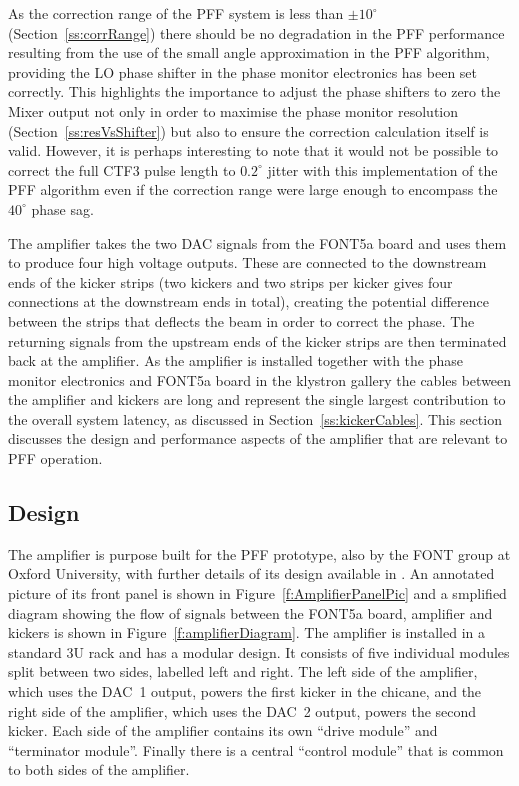 As the correction range of the PFF system is less than \(\pm10^\circ\) (Section~\ref{ss:corrRange}) there should be no degradation in the PFF performance resulting from the use of the small angle approximation in the PFF algorithm, providing the LO phase shifter in the phase monitor electronics has been set correctly. This highlights the importance to adjust the phase shifters to zero the Mixer output not only in order to maximise the phase monitor resolution (Section~\ref{ss:resVsShifter}) but also to ensure the correction calculation itself is valid. However, it is perhaps interesting to note that it would not be possible to correct the full CTF3 pulse length to \(0.2^\circ\) jitter with this implementation of the PFF algorithm even if the correction range were large enough to encompass the \(40^\circ\) phase sag.


The amplifier takes the two DAC signals from the FONT5a board and
uses them to produce four high voltage outputs. These are connected to the downstream ends of the kicker strips (two kickers and two strips per kicker gives four connections at the downstream ends in total), creating the potential difference between the strips that deflects the beam in order to correct the phase. The returning signals from the upstream ends of the kicker strips are then terminated back at the amplifier. As the amplifier is installed together with the phase monitor electronics and FONT5a board in the klystron gallery the cables between the amplifier and kickers are long and represent the single largest contribution to the overall system latency, as discussed in Section~\ref{ss:kickerCables}. This section discusses the design and performance aspects of the amplifier that are relevant to PFF operation.

\subsection{Design}
\label{ss:ampDesign}

The amplifier is purpose built for the PFF prototype, also by the FONT group at Oxford University, with further details of its design available in \cite{colinCLIC16}. An annotated picture of its front panel is shown in Figure~\ref{f:AmplifierPanelPic} and a smplified diagram showing the flow of signals between the FONT5a board, amplifier and kickers is shown in Figure~\ref{f:amplifierDiagram}.
The amplifier is installed in a standard 3U rack and has a modular design. It consists of five individual modules split between two sides, labelled left and right. The left side of the amplifier, which uses the DAC~1 output, powers the first kicker in the chicane, and the right side of the amplifier, which uses the DAC~2 output, powers the second kicker. Each side of the amplifier contains its own ``drive module'' and ``terminator module''. Finally there is a central ``control module'' that is common to both sides of the amplifier.

